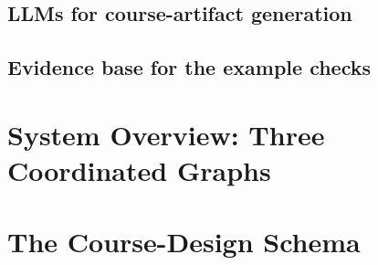 \documentclass[sigconf,review]{acmart}
\begin{document}
\subsection{LLMs for course-artifact generation}

\subsection{Evidence base for the example checks}

\section{System Overview: Three Coordinated Graphs}
\label{sec:overview}



\section{The Course-Design Schema}
\label{sec:schema}
\end{document}
